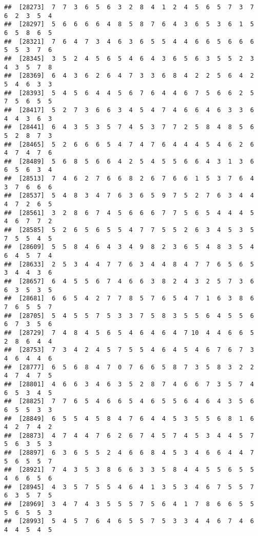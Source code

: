 \documentclass[
]{book}
\begin{document}
\begin{verbatim}
##  [28273]  7  7  3  6  5  6  3  2  8  4  1  2  4  5  6  5  7  3  7  6  2  3  5  4
##  [28297]  5  6  6  6  6  4  8  5  8  7  6  4  3  6  5  3  6  1  5  6  5  8  6  5
##  [28321]  7  6  4  7  3  4  6  3  6  5  5  4  4  6  6  5  6  6  6  5  5  3  7  6
##  [28345]  3  5  2  4  5  6  5  4  6  4  3  6  5  6  3  5  5  2  3  4  3  5  7  8
##  [28369]  6  4  3  6  2  6  4  7  3  3  6  8  4  2  2  5  6  4  2  5  4  6  3  3
##  [28393]  5  4  5  6  4  4  5  6  7  6  4  4  6  7  5  6  6  2  5  7  5  6  5  5
##  [28417]  5  2  7  3  6  6  3  4  5  4  7  4  6  6  4  6  3  3  6  4  4  3  6  3
##  [28441]  6  4  3  5  3  5  7  4  5  3  7  7  2  5  8  4  8  5  6  5  2  8  7  3
##  [28465]  5  2  6  6  6  5  4  7  4  7  6  4  4  4  5  4  6  2  6  4  7  4  7  6
##  [28489]  5  6  8  5  6  6  4  2  5  4  5  5  6  6  4  3  1  3  6  6  5  6  3  4
##  [28513]  7  4  6  2  7  6  6  8  2  6  7  6  6  1  5  3  7  6  4  3  7  6  6  6
##  [28537]  5  4  8  3  4  7  6  3  6  5  9  7  5  2  7  6  3  4  4  4  7  2  6  5
##  [28561]  3  2  8  6  7  4  5  6  6  6  7  7  5  6  5  4  4  4  5  4  6  7  7  2
##  [28585]  5  2  6  5  6  5  5  4  7  7  5  5  2  6  3  4  5  3  5  7  5  5  4  5
##  [28609]  5  5  8  4  6  4  3  4  9  8  2  3  6  5  4  8  3  5  4  6  4  5  7  4
##  [28633]  2  5  3  4  4  7  7  6  3  4  4  8  4  7  7  6  5  6  5  3  4  4  3  6
##  [28657]  6  4  5  5  6  7  4  6  6  3  8  2  4  3  2  5  7  3  6  6  3  5  3  5
##  [28681]  6  6  5  4  2  7  7  8  5  7  6  5  4  7  1  6  3  8  6  7  6  5  5  7
##  [28705]  5  4  5  5  7  5  3  3  7  5  8  3  5  5  6  4  5  5  6  6  7  3  5  6
##  [28729]  7  4  8  4  5  6  5  4  6  4  6  4  7 10  4  4  6  6  5  2  8  6  4  4
##  [28753]  7  3  4  2  4  5  7  5  5  4  6  4  5  4  6  7  6  7  3  4  6  4  4  6
##  [28777]  6  5  6  8  4  7  0  7  6  6  5  8  7  3  5  8  3  2  2  4  7  4  7  5
##  [28801]  4  6  6  3  4  6  3  5  2  8  7  4  6  6  7  3  5  7  4  6  5  3  4  5
##  [28825]  7  7  6  5  4  6  6  5  4  6  5  5  6  4  6  4  3  5  6  6  5  5  3  3
##  [28849]  6  5  5  4  5  8  4  7  6  4  4  5  3  5  5  6  8  1  6  4  2  7  4  2
##  [28873]  4  7  4  4  7  6  2  6  7  4  5  7  4  5  3  4  4  5  7  5  6  3  5  3
##  [28897]  6  3  6  5  5  2  4  6  6  8  4  5  3  4  6  6  4  4  7  5  6  5  5  7
##  [28921]  7  4  3  5  3  8  6  6  3  3  5  8  4  4  5  5  6  5  5  4  6  6  5  6
##  [28945]  4  3  5  7  5  5  4  6  4  1  3  5  3  4  6  7  5  5  7  6  3  5  7  5
##  [28969]  3  4  7  4  3  5  5  5  7  5  6  4  1  7  8  6  6  5  5  5  6  5  5  3
##  [28993]  5  4  5  7  6  4  6  5  5  7  5  3  3  4  4  6  7  4  6  4  4  5  4  5

\end{verbatim}
\end{document}
